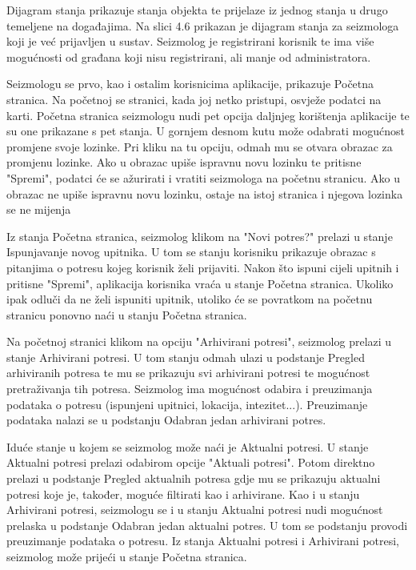 		Dijagram stanja prikazuje stanja objekta te prijelaze iz jednog stanja u drugo temeljene na događajima. Na slici 4.6 prikazan je dijagram stanja za seizmologa koji je već prijavljen u sustav. Seizmolog je registrirani korisnik te ima više mogućnosti od građana koji nisu registrirani, ali manje od administratora. 
        
		Seizmologu se prvo, kao i ostalim korisnicima aplikacije, prikazuje Početna stranica. Na početnoj se stranici, kada joj netko pristupi, osvježe podatci na karti. Početna stranica seizmologu nudi pet opcija daljnjeg korištenja aplikacije te su one prikazane s pet stanja. 
        U gornjem desnom kutu može odabrati mogućnost promjene svoje lozinke. Pri kliku na tu opciju, odmah mu se otvara obrazac za promjenu lozinke.
        Ako u obrazac upiše ispravnu novu lozinku te pritisne "Spremi", podatci će se ažurirati i vratiti seizmologa na početnu stranicu. Ako u obrazac ne upiše ispravnu novu lozinku, ostaje na istoj stranica i njegova lozinka se ne mijenja
        
		Iz stanja Početna stranica, seizmolog klikom na "Novi potres?" prelazi u stanje Ispunjavanje novog upitnika. U tom se stanju korisniku prikazuje obrazac s pitanjima o potresu kojeg korisnik želi prijaviti. 
        Nakon što ispuni cijeli upitnih i pritisne "Spremi", aplikacija korisnika vraća u stanje Početna stranica.
        Ukoliko ipak odluči da ne želi ispuniti upitnik, utoliko će se povratkom na početnu stranicu ponovno naći u stanju Početna stranica. 
        
		Na početnoj stranici klikom na opciju "Arhivirani potresi", seizmolog prelazi u stanje Arhivirani potresi. U tom stanju odmah ulazi u podstanje Pregled arhiviranih potresa te mu se prikazuju svi arhivirani potresi te mogućnost pretraživanja tih potresa.
        Seizmolog ima mogućnost odabira i preuzimanja podataka o potresu (ispunjeni upitnici, lokacija, intezitet...). Preuzimanje podataka nalazi se u podstanju Odabran jedan arhivirani potres.
        
		Iduće stanje u kojem se seizmolog može naći je Aktualni potresi. U stanje Aktualni potresi prelazi odabirom opcije "Aktuali potresi". 
        Potom direktno prelazi u podstanje Pregled aktualnih potresa gdje mu se prikazuju aktualni potresi koje je, također, moguće filtirati kao i arhivirane. Kao i u stanju Arhivirani potresi, seizmologu se i u stanju Aktualni potresi nudi mogućnost 
        prelaska u podstanje Odabran jedan aktualni potres. U tom se podstanju provodi preuzimanje podataka o potresu. Iz stanja Aktualni potresi i Arhivirani potresi, seizmolog može prijeći u stanje Početna stranica.
       
